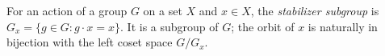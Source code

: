 
For an action of a group $G$ on a set $X$ and $x\in X$, the \emph{stabilizer subgroup} is $G_x=\{g\in G:g\cdot x=x\}$. It is a subgroup of $G$; the orbit of $x$ is naturally in bijection with the left coset space $G/G_x$.
